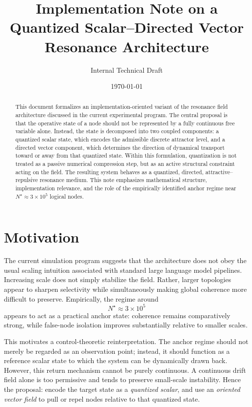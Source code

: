 \documentclass[11pt,a4paper]{article}
\title{Implementation Note on a Quantized Scalar--Directed Vector\\
Resonance Architecture}
\author{Internal Technical Draft}
\date{\today}
\begin{document}
\maketitle

\begin{abstract}
This document formalizes an implementation-oriented variant of the resonance
field architecture discussed in the current experimental program. The central
proposal is that the operative state of a node should not be represented by a
fully continuous free variable alone. Instead, the state is decomposed into
two coupled components: a quantized scalar state, which encodes the admissible
discrete attractor level, and a directed vector component, which determines the
direction of dynamical transport toward or away from that quantized state.
Within this formulation, quantization is not treated as a passive numerical
compression step, but as an active structural constraint acting on the field.
The resulting system behaves as a quantized, directed, attractive--repulsive
resonance medium. This note emphasizes mathematical structure, implementation
relevance, and the role of the empirically identified anchor regime near
$N^\star \approx 3 \times 10^5$ logical nodes.
\end{abstract}

\section{Motivation}
The current simulation program suggests that the architecture does not obey the
usual scaling intuition associated with standard large language model pipelines.
Increasing scale does not simply stabilize the field. Rather, larger topologies
appear to sharpen selectivity while simultaneously making global coherence more
difficult to preserve. Empirically, the regime around
\[
N^\star \approx 3 \times 10^5
\]
appears to act as a practical anchor state: coherence remains comparatively
strong, while false-node isolation improves substantially relative to smaller
scales.

This motivates a control-theoretic reinterpretation. The anchor regime should
not merely be regarded as an observation point; instead, it should function as
a reference scalar state to which the system can be dynamically drawn back.
However, this return mechanism cannot be purely continuous. A continuous drift
field alone is too permissive and tends to preserve small-scale instability.
Hence the proposal: encode the target state as a \emph{quantized scalar}, and
use an \emph{oriented vector field} to pull or repel nodes relative to that
quantized state.
\end{document}

